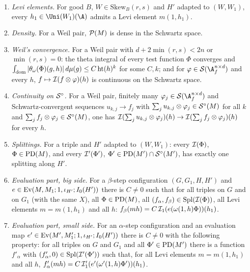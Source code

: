 \begin{definition}
\begin{enumerate}[label=(L\arabic*),leftmargin=*]
$\Phi\approx\Phi'$ and $\Phi'\in\thmKSo(M')$ then $\Phi\in\thmKPD(M)$, $\Phi'\in\thmKPD(M')$ and $\Phi\sim\Phi'$.
\item\label{pf:thmK:L:levi} \emph{Levi elements.} For good $B$, $W\in\mathrm{Skew}_B(r,s)$ and $H'$ adapted to $(W,W_1)$,
every $h_1\in\Uni(W_1)(\A)$ admits a Levi element $m(1,h_1)$.
\item\label{pf:thmK:L:poldense} \emph{Density.} For a Weil pair, $\mathcal{P}(M)$ is dense in the Schwartz space.
\item\label{pf:thmK:L:weilconv} \emph{Weil's convergence.} For a Weil pair with $d+2\min(r,s)<2n$ or $\min(r,s)=0$: the theta
integral of every test function $\Phi$ converges and $\int_{\mathrm{dom}}|\theta_\omega(\Phi)(g,h)|\,d\mu(g)\le
C\operatorname{ht}(h)^k$ for some $C,k$; and for $\varphi\in\thmKS(\A_f^{n\times d})$ and every $h$, $f\mapsto\mathcal{I}(f\otimes
\varphi)(h)$ is continuous on the Schwartz space.
\item\label{pf:thmK:L:socont} \emph{Continuity on $\mathcal{S}^{\circ}$.} For a Weil pair, finitely many $\varphi_j\in\thmKS(\A_f^{n\times
d})$ and Schwartz-convergent sequences $u_{k,j}\to f_j$ with $\sum_ju_{k,j}\otimes\varphi_j\in\mathcal{S}^{\circ}(M)$ for all $k$ and
$\sum_jf_j\otimes\varphi_j\in\mathcal{S}^{\circ}(M)$, one has $\mathcal{I}(\sum_ju_{k,j}\otimes\varphi_j)(h)\to
\mathcal{I}(\sum_jf_j\otimes\varphi_j)(h)$ for every $h$.
\item\label{pf:thmK:L:splitex} \emph{Splittings.} For a triple and $H'$ adapted to $(W,W_1)$: every $\mathcal{I}(\Phi)$,
$\Phi\in\thmKPD(M)$, and every $\mathcal{I}'(\Phi')$, $\Phi'\in\operatorname{PD}(M')\cap\mathcal{S}^{\circ}(M')$, has exactly one splitting along $H'$.
\item\label{pf:thmK:L:ctbz} \emph{Evaluation part, big side.} For a $\beta$-step configuration $(G,G_1,H,H')$ and
$e\in\operatorname{Ev}(M,M_1;1,\iota_{H'};I_0(H'))$ there is $C\ne0$ such that for all triples on $G$ and on $G_1$ (with the same
$X$), all $\Phi\in\thmKPD(M)$, all $(f_\alpha,f_\beta)\in\operatorname{Spl}(\mathcal{I}(\Phi))$, all Levi elements $m=m(1,h_1)$ and all
$h$: $f_\beta(mh)=C\,\mathcal{I}_1(e(\omega(1,h)\Phi))(h_1)$.
\item\label{pf:thmK:L:ctsz} \emph{Evaluation part, small side.} For an $\alpha$-step configuration and an evaluation map
$e'\in\operatorname{Ev}(M',M'_1;1,\iota_{H'};I_0(H'))$ there is $C\ne0$ with the following property: for all triples on $G$ and
$G_1$ and all $\Phi'\in\thmKPD(M')$ there is a function $f'_\alpha$ with $(f'_\alpha,0)\in\operatorname{Spl}(\mathcal{I}'(\Phi'))$ such
that, for all Levi elements $m=m(1,h_1)$ and all $h$, $f'_\alpha(mh)=C\,\mathcal{I}'_1(e'(\omega'(1,h)\Phi'))(h_1)$.

\end{enumerate}
\end{definition}
